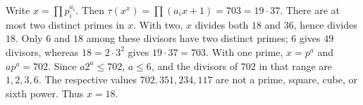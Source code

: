 Write $x=\prod p_i^{a_i}$. Then $\tau(x^x)=\prod(a_ix+1)=703=19\cdot37$. There are at most two distinct primes in $x$. With two, $x$ divides both $18$ and $36$, hence divides $18$. Only $6$ and $18$ among these divisors have two distinct primes; $6$ gives $49$ divisors, whereas $18=2\cdot3^2$ gives $19\cdot37=703$. With one prime, $x=p^a$ and $ap^a=702$. Since $a2^a\le702$, $a\le6$, and the divisors of $702$ in that range are $1,2,3,6$. The respective values $702,351,234,117$ are not a prime, square, cube, or sixth power. Thus $\boxed{x=18}$.
